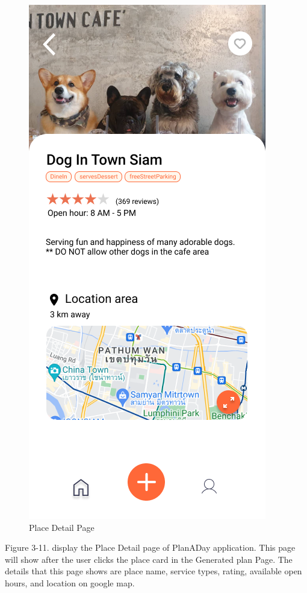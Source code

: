 \newpage
\begin{figure}[!h]
    \centering
    \includegraphics[width=0.5\linewidth]{chapter3/UI_Place_detail.png}
    \caption{Place Detail Page}
    \label{fig:Place Detail Page}
\end{figure}
\noindent
Figure 3-11. display the Place Detail page of PlanADay application. This page will
show after the user clicks the place card in the Generated plan Page. The details
that this page shows are place name, service types, rating, available open hours, and
location on google map.

